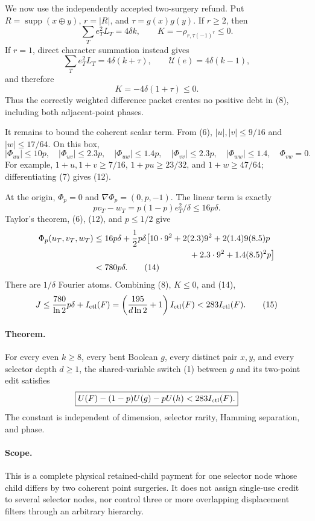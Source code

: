 We now use the independently accepted two-surgery refund.  Put
$R=\operatorname{supp}(x\oplus y)$, $r=|R|$, and
$\tau=g(x)g(y)$.  If $r\ge2$, then
\[
 \sum_Te_T^2L_T=4\delta k,
 \qquad K=-\rho_{r,\tau(-1)^r}\le0.                      \tag{10}
\]
If $r=1$, direct character summation instead gives
\[
 \sum_Te_T^2L_T=4\delta(k+\tau),\qquad
 \mathcal U(e)=4\delta(k-1),
\]
and therefore
\[
 K=-4\delta(1+\tau)\le0.                                 \tag{11}
\]
Thus the correctly weighted difference packet creates no positive debt in
(8), including both adjacent-point phases.

It remains to bound the coherent scalar term.  From (6),
$|u|,|v|\le9/16$ and $|w|\le17/64$.  On this box,
\[
 |\Phi_{uu}|\le10p,\quad |\Phi_{uv}|\le2.3p,\quad
 |\Phi_{uw}|\le1.4p,\quad |\Phi_{vv}|\le2.3p,\quad
 |\Phi_{ww}|\le1.4,\quad \Phi_{vw}=0.                    \tag{12}
\]
For example, $1+u,1+v\ge7/16$, $1+pu\ge23/32$, and
$1+w\ge47/64$; differentiating (7) gives (12).

At the origin, $\Phi_p=0$ and $\nabla\Phi_p=(0,p,-1)$.  The linear term
is exactly
\[
 pv_T-w_T=p(1-p)e_T^2/\delta\le16p\delta.                 \tag{13}
\]
Taylor's theorem, (6), (12), and $p\le1/2$ give
\begin{align*}
 \Phi_p(u_T,v_T,w_T)
 &\le16p\delta+\frac12p\delta\bigl[
 10\cdot9^2+2(2.3)9^2+2(1.4)9(8.5)p\\
 &\hspace{40mm}+2.3\cdot9^2+1.4(8.5)^2p\bigr]\\
 &<780p\delta.                                            \tag{14}
\end{align*}
There are $1/\delta$ Fourier atoms.  Combining (8), $K\le0$, and (14),
\[
 J\le\frac{780}{\ln2}p\delta+I_{\rm ctl}(F)
 =\left(\frac{195}{d\ln2}+1\right)I_{\rm ctl}(F)
 <283I_{\rm ctl}(F).                                      \tag{15}
\]

\paragraph{Theorem.}
For every even $k\ge8$, every bent Boolean $g$, every distinct pair
$x,y$, and every selector depth $d\ge1$, the shared-variable switch (1)
between $g$ and its two-point edit satisfies
\[
 \boxed{U(F)-(1-p)U(g)-pU(h)<283I_{\rm ctl}(F).}
\]
The constant is independent of dimension, selector rarity, Hamming
separation, and phase.

\paragraph{Scope.}
This is a complete physical retained-child payment for one selector node
whose child differs by two coherent point surgeries.  It does not assign
single-use credit to several selector nodes, nor control three or more
overlapping displacement filters through an arbitrary hierarchy.
